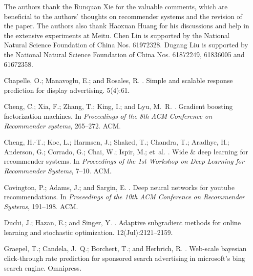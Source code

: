 \documentclass[sigconf]{acmart}
\begin{document}
\begin{acks}
The authors thank the Runquan Xie for the valuable comments, which are beneficial to the authors’ thoughts on recommender systems and the revision of the paper.
The authors also thank Haoxuan Huang for his discussions and help in the extensive experiments at Meitu. Chen Lin is supported by the National Natural Science Foundation of China Nos. 61972328. Dugang Liu is supported by the National Natural Science Foundation of China Nos. 61872249, 61836005 and 61672358. 
\end{acks}
\begin{thebibliography}{10}

Chapelle, O.; Manavoglu, E.; and Rosales, R.
.
\newblock Simple and scalable response prediction for display advertising.
  5(4):61.

Cheng, C.; Xia, F.; Zhang, T.; King, I.; and Lyu, M.~R.
.
\newblock Gradient boosting factorization machines.
\newblock In {\em Proceedings of the 8th ACM Conference on Recommender
  systems},  265--272.
\newblock ACM.

Cheng, H.-T.; Koc, L.; Harmsen, J.; Shaked, T.; Chandra, T.; Aradhye, H.;
  Anderson, G.; Corrado, G.; Chai, W.; Ispir, M.; et~al.
.
\newblock Wide \& deep learning for recommender systems.
\newblock In {\em Proceedings of the 1st Workshop on Deep Learning for
  Recommender Systems},  7--10.
\newblock ACM.

Covington, P.; Adams, J.; and Sargin, E.
.
\newblock Deep neural networks for youtube recommendations.
\newblock In {\em Proceedings of the 10th ACM Conference on Recommender
  Systems},  191--198.
\newblock ACM.

Duchi, J.; Hazan, E.; and Singer, Y.
.
\newblock Adaptive subgradient methods for online learning and stochastic
  optimization.
 12(Jul):2121--2159.

Graepel, T.; Candela, J.~Q.; Borchert, T.; and Herbrich, R.
.
\newblock Web-scale bayesian click-through rate prediction for sponsored search
  advertising in microsoft's bing search engine.
\newblock Omnipress.


\end{thebibliography}
\end{document}
